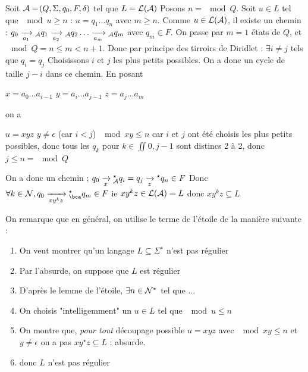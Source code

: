 \documentclass[a4paper,french,bookmarks]{book}
\begin{document}
    \begin{nproof}
        Soit $\mathcal{A} = \!\left(Q, \Sigma, q_0, F, \delta\right)$ tel que $L = \mathcal{L}\!\left(\mathcal{A}\right)$
        Posons $n = \mod{Q}$.
        Soit $u \in L$ tel que $\mod{u} \geq n$ : $u = q_1 \dots q_n$ avec $m \geq n$.
        Comme $u \in \mathcal{L}\!\left(\mathcal{A}\right)$, il existe un chemin :
        $q_0 \lima{a_1}{}_\bcA q_1 \lima{a_2}{}_\bcA q_2 \dots \lima{a_m}{}_\bcA q_m$ avec $q_m \in F$.
        On passe par $m=1$ états de $Q$, et $\mod{Q} = n \leq m < n + 1$.
        Donc par principe des tirroirs de Diridlet :
        $\exists i \neq j$ tels que $q_i = q_j$
        Choisissons $i$ et $j$ les plus petits possibles. On a donc un cycle de taille $j-i$ dans ce chemin. En posant
        \begin{enumerate}
            \itt $x = a_0 \dots a_{i-1}$
            \itt $y = a_i \dots a_{j-1}$
            \itt $z = a_j \dots a_m$
        \end{enumerate}
        on a
        \begin{enumerate}
            \itt $u = x y z$
            \itt $y \neq \epsilon$ (car $i<j$)
            \itt $\mod{xy} \leq n$ car $i$ et $j$ ont été choisis les plus petits possibles, donc tous les $q_k$ pour $k \in \iint{0, j - 1}$ sont distincs 2 à 2, donc $j \leq n = \mod{Q}$
        \end{enumerate}
        On a donc un chemin ;
        $q_0  \lima{x}{}_\bcA^\star q_i = q_j \lima{z}{}^\star q_n \in F$
        Donc $\forall k \in \bcN, q_0 \lima{x y^k z}{}_\bca^\star q_m \in F$
        ie $xy^kz \in \mathcal{L}\!\left(\mathcal{A}\right) = L$
        donc $xy^kz \subseteq L$
    \end{nproof}
    On remarque que en général, on utilise le terme de l'étoile de la manière suivante :
    \begin{enumerate}
        \item On veut montrer qu'un langage $L \subseteq \Sigma^\star$ n'est pas régulier
        \item Par l'absurde, on suppose que $L$ est régulier
        \item D'après le lemme de l'étoile, $\exists n \in \mathcal{N}^\star$ tel que ...
        \item On choisis "intelligemment" un $u \in L$ tel que $\mod{u} \leq n$
        \item On montre que, \emph{pour tout} découpage possible $u = x y z$ avec $\mod{xy} \leq n$ et $y \neq \epsilon$ on a pas $x y^\star z \subseteq L$ : absurde.
        \item donc $L$ n'est pas régulier
    \end{enumerate}
    
\end{document}

